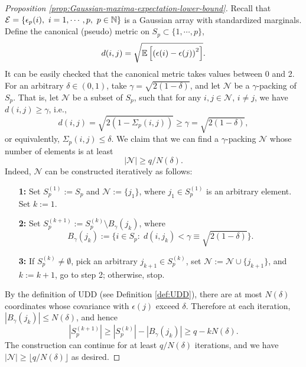 \begin{proof}[Proposition \ref{prop:Gaussian-maxima-expectation-lower-bound}]
Recall that ${\cal E} = \{\epsilon_p(i),\ i=1,\cdots,p,\ p\in\N\}$ is a Gaussian array with standardized marginals.
Define the canonical (pseudo) metric on $S_p \subset\{1,\cdots,p\}$,
$$
d(i,j) = \sqrt{{\mathbb E}\left[\left(\epsilon(i)-\epsilon(j)\right)^2\right]}.
$$
It can be easily checked that the canonical metric takes values between 0 and 2.
For an arbitrary $\delta\in(0,1)$, take $\gamma = \sqrt{2(1-\delta)}$, and
let $\mathcal{N}$ be a $\gamma$-packing of $S_p$. That is, let $\mathcal{N}$ be a subset of $S_p$, such that for any $i,j\in\mathcal{N}$, $i\neq j$, we have $d(i,j)\ge\gamma$, i.e.,
\begin{equation}\label{e:gamma-packing-def}
d(i,j) = \sqrt{2\left(1-\Sigma_p(i,j)\right)} \ge \gamma = \sqrt{2(1-\delta)},
\end{equation}
or equivalently, $\Sigma_p(i,j) \le \delta$.
We claim that we can find a $\gamma$-packing $\mathcal{N}$ whose number of elements is at least 
\begin{equation} \label{eq:packing-number-lower-bound}
    |\mathcal{N}| \ge q/N(\delta).
\end{equation}
Indeed, $\mathcal{N}$ can be constructed iteratively as follows:
\begin{itemize}    \raggedright
    \item[{\bf 1:}] Set $S_p^{(1)}:=S_p$ and $\mathcal{N}:=\{j_1\}$, where $j_1\in S_p^{(1)}$ is an arbitrary element. Set $k:=1$.\\
    \item[{\bf 2:}] Set $S_p^{(k+1)}:=S_p^{(k)}\setminus B_\gamma(j_k)$, where
    $$
    B_\gamma(j_k) := \{i\in S_p: \;d(i,j_k) < \gamma \equiv \sqrt{2(1-\delta)}\}.
    $$
    \item[{\bf 3:}] If $S_p^{(k)} \neq \emptyset$, pick an arbitrary $j_{k+1}\in S_p^{(k)}$, set $\mathcal{N}:=\mathcal{N}\cup\{j_{k+1}\}$, and $k:=k+1$, go to step 2; otherwise, stop.
\end{itemize}
By the definition of UDD (see Definition \ref{def:UDD}), there are at most $N(\delta)$ coordinates whose covariance with $\epsilon(j)$ exceed $\delta$. 
Therefore at each iteration, $\left|B_\gamma(j_k)\right|\le N(\delta)$, and hence
$$
\left|S_p^{(k+1)}\right| \ge \left|S_p^{(k)}\right| - \left| B_\gamma(j_k)\right| \ge q - kN(\delta).
$$
The construction can continue for at least $q/N(\delta)$ iterations, and we have $|\mathcal{N}| \ge \lfloor q/N(\delta) \rfloor$ as desired.
    

\end{proof}
